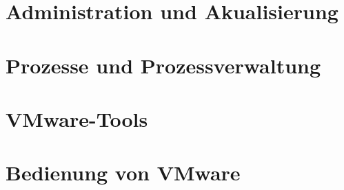 \documentclass[12pt]{article}
\theoremstyle{plain}
\begin{document}
\begin{linenumbers}
\section{Administration und Akualisierung}
\section{Prozesse und Prozessverwaltung}
\section{VMware-Tools}
\section{Bedienung von VMware}
\end{linenumbers}
\end{document}
